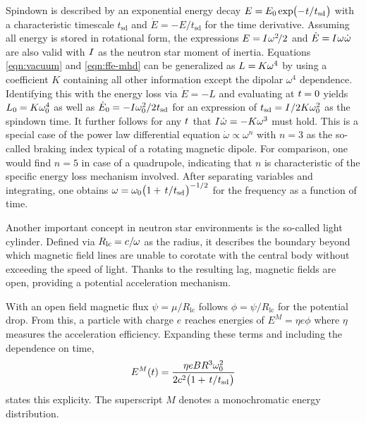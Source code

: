 Spindown is described by an exponential energy decay $E = \kern-0.3pt E_0 \kern-0.2pt \exp \kern-2.0pt
\smash{\bigl( - \kern+0.5pt t \kern+0.1pt / \kern+0.2pt t_\text{sd} \kern+0.5pt \bigr)}$ with a characteristic timescale
$t_\text{sd}$ and $\dot{E} = - E / t_\text{sd}$ for the time derivative. Assuming all energy is stored in
rotational form, the expressions $E = \kern-0.5pt I \kern+0.5pt \omega^2 \kern-1.5pt / 2$ and
$\dot{E} = \kern-0.5pt I \kern+0.5pt \omega \kern+0.5pt \dot{\omega}$ are also valid with $I \kern+0.5pt$ as the neutron star
moment of inertia. Equations \eqref{eqn:vacuum} and \eqref{eqn:ffe-mhd} can be generalized as $L = \kern-0.5pt K \omega^4$ by
using a coefficient $K$ containing all other information except the dipolar $\omega^4$ dependence. Identifying this with the energy
loss via $\dot{E} = -L$ and evaluating at $t \kern-0.3pt= 0$ yields $L_0 \kern-0.3pt = \kern-0.2pt K \omega_0^4$ as well as
$\dot{E}_0 \kern-0.3pt = -I \omega_0^2 / 2 \kern+0.4pt t_\text{sd}$ for an expression of
$t_\text{sd} = I \kern+0.5pt / 2K\omega_0^2$ as the spindown time. It further follows for any $t \kern+0.5pt$ that
$I \kern+0.5pt \dot{\omega} = -K \omega^3$ must hold. This is a special case of the power law differential equation
$\dot{\omega} \propto \omega^n$ with $n = 3$ as the so-called braking index typical of a rotating magnetic dipole. 
For comparison, one would find $n = 5$ in case of a quadrupole, indicating that $n$ is characteristic of the specific
energy loss mechanism involved. After separating variables and integrating, one obtains
$\omega = \omega_0 \smash{\bigl( 1 + \kern+1.5pt t \kern+0.1pt / \kern+0.2pt t_\text{sd} \kern+0.5pt \bigr)^{-1/2}}$
for the frequency as a function of time.

Another important concept in neutron star environments is the so-called light cylinder. Defined via
$R_\text{lc} \kern-0.6pt = c / \kern-0.4pt \omega$ as the radius, it describes the boundary beyond which magnetic field lines
are unable to corotate with the central body without exceeding the speed of light. Thanks to the resulting lag, magnetic fields
are open, providing a potential acceleration mechanism.

With an open field magnetic flux $\psi = \mu / R_\text{lc}$ follows $\phi = \psi / R_\text{lc}$ for the potential drop. From
this, a particle with charge $e$ reaches energies of $E^M = \eta e \phi$ where $\eta$ measures the acceleration efficiency.
Expanding these terms and including the dependence on time,
\begin{equation}
	E^M(t) = \frac{\eta e B R^3 \omega_0^2}{2c^2 \bigl( 1 + \kern+1.5pt t \kern+0.1pt / \kern+0.2pt t_\text{sd} \kern+0.5pt \bigr)}
	\label{eqn:mono}
\end{equation}
states this explicity. The superscript $M$ denotes a monochromatic energy distribution.



